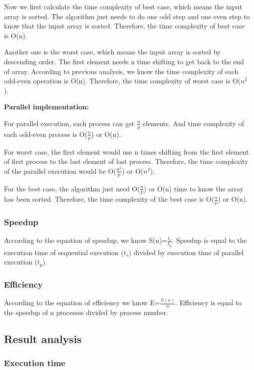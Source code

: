 Now we first calculate the time complexity of best case, which means the input array is sorted. The algorithm just needs to do one odd step and one even step to know that the input array is sorted. Therefore, the time complexity of best case is O(n).

Another one is the worst case, which means the input array is sorted by descending order. The first element needs n time shifting to get back to the end of array. According to previous analysis, we know the time complexity of each odd-even operation is O(n). Therefore, the time complexity of worst case is O($n^2$).

\textbf{Parallel implementation:}

For parallel execution, each process can get $\frac{n}{p}$ elements. And time complexity of each odd-even process is O($\frac{n}{p}$) or O(n).

For worst case, the first element would use n times shifting from the first element of first process to the last element of last process. Therefore, the time complexity of the parallel execution would be O($\frac{n^2}{p}$) or O($n^2$).

For the best case, the algorithm just need O($\frac{n}{p}$) or O(n) time to know the array has been sorted. Therefore, the time complexity of the best case is O($\frac{n}{p}$) or O(n).

\subsubsection{Speedup}


According to the equation of speedup, we know S(n)=$\frac{t_{s}}{t_{p}}$. Speedup is equal to the execution time of sequential execution ($t_{s}$) divided by execution time of parallel execution ($t_{p}$).

\subsubsection{Efficiency}

According to the equation of efficiency we know E=$\frac{S(n)}{n}$. Efficiency is equal to the speedup of n processes divided by process number. 

\subsection{Result analysis}

\subsubsection{Execution time}

